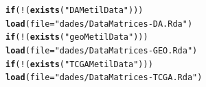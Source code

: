 \documentclass[a4paper,10pt]{article}\usepackage[]{graphicx}\usepackage[]{color}
\makeatletter
\newcommand{\hlstr}[1]{\textcolor[rgb]{0.192,0.494,0.8}{#1}}%
\newcommand{\hlopt}[1]{\textcolor[rgb]{0,0,0}{#1}}%
\newcommand{\hlstd}[1]{\textcolor[rgb]{0.345,0.345,0.345}{#1}}%
\newcommand{\hlkwa}[1]{\textcolor[rgb]{0.161,0.373,0.58}{\textbf{#1}}}%
\newcommand{\hlkwc}[1]{\textcolor[rgb]{0.333,0.667,0.333}{#1}}%
\newcommand{\hlkwd}[1]{\textcolor[rgb]{0.737,0.353,0.396}{\textbf{#1}}}%
\newenvironment{kframe}{%
 \def\at@end@of@kframe{}%
 \ifinner\ifhmode%
  \def\at@end@of@kframe{\end{minipage}}%
  \begin{minipage}{\columnwidth}%
 \fi\fi%
 \def\FrameCommand##1{\hskip\@totalleftmargin \hskip-\fboxsep
 \colorbox{shadecolor}{##1}\hskip-\fboxsep
     \hskip-\linewidth \hskip-\@totalleftmargin \hskip\columnwidth}%
 \MakeFramed {\advance\hsize-\width
   \@totalleftmargin\z@ \linewidth\hsize
   \@setminipage}}%
 {\par\unskip\endMakeFramed%
 \at@end@of@kframe}
\newenvironment{knitrout}{}{} %
\makeatother
\begin{document}
\begin{knitrout}
\color{fgcolor}\begin{kframe}
\begin{alltt}
\hlkwa{if} \hlstd{(}\hlopt{!}\hlstd{(}\hlkwd{exists}\hlstd{(}\hlstr{"DAMetilData"}\hlstd{)))}
  \hlkwd{load}\hlstd{(}\hlkwc{file}\hlstd{=}\hlstr{"dades/DataMatrices-DA.Rda"}\hlstd{)}
\hlkwa{if} \hlstd{(}\hlopt{!}\hlstd{(}\hlkwd{exists}\hlstd{(}\hlstr{"geoMetilData"}\hlstd{)))}
  \hlkwd{load}\hlstd{(}\hlkwc{file}\hlstd{=}\hlstr{"dades/DataMatrices-GEO.Rda"}\hlstd{)}
\hlkwa{if} \hlstd{(}\hlopt{!}\hlstd{(}\hlkwd{exists}\hlstd{(}\hlstr{"TCGAMetilData"}\hlstd{)))}
  \hlkwd{load}\hlstd{(}\hlkwc{file}\hlstd{=}\hlstr{"dades/DataMatrices-TCGA.Rda"}\hlstd{)}
\end{alltt}
\end{kframe}
\end{knitrout}
\end{document}
